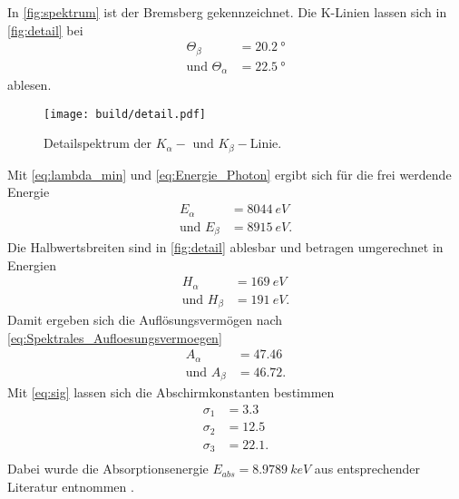 In \autoref{fig:spektrum} ist der Bremsberg gekennzeichnet. Die K-Linien lassen sich in \autoref{fig:detail} bei 
\begin{align*}
  \Theta_{\beta} &= \SI{20.2}{°} \\
  \text{und }\Theta_{\alpha} &= \SI{22.5}{°}
\end{align*}
ablesen.
\begin{figure}[H]
  \texttt{[image: build/detail.pdf]}
  \caption{Detailspektrum der $K_{\alpha}-$ und $K_{\beta}-$Linie.}
  \label{fig:detail}
\end{figure}
Mit \autoref{eq:lambda_min} und \autoref{eq:Energie_Photon} ergibt sich für die frei werdende Energie
\begin{align*}
  E_{\alpha} &= \SI{8044}{eV} \\
  \text{und }E_{\beta} &= \SI{8915}{eV}.
\end{align*}
Die Halbwertsbreiten sind in \autoref{fig:detail} ablesbar und betragen umgerechnet in Energien
\begin{align*}
  H_{\alpha} &= \SI{169}{eV} \\
  \text{und }H_{\beta} &= \SI{191}{eV}.
\end{align*}
Damit ergeben sich die Auflösungsvermögen nach \autoref{eq:Spektrales_Aufloesungsvermoegen}
\begin{align*}
  A_{\alpha} &= 47.46 \\
  \text{und }A_{\beta} &= 46.72.
\end{align*}
Mit \autoref{eq:sig} lassen sich die Abschirmkonstanten bestimmen
\begin{align*}
  σ_1 &= 3.3\\
  σ_2 &= 12.5\\
  σ_3 &= 22.1.\\
\end{align*}
Dabei wurde die Absorptionsenergie $E_{abs} = \SI{8.9789}{keV}$ aus entsprechender Literatur entnommen \cite{E_abs}.

